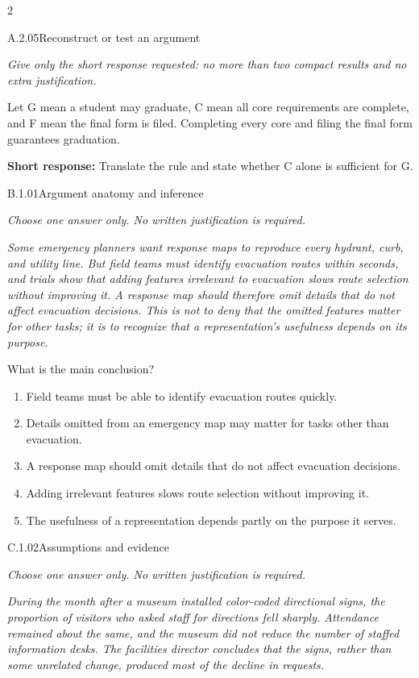 \documentclass[9pt]{extarticle}
\newcommand{\choice}[1]{\item #1}
\begin{document}
\begin{multicols}{2}
\begin{DenseCoreProblem}{A.2.05}{Reconstruct or test an argument}
{\scriptsize\textit{Give only the short response requested: no more than two compact results and no extra justification.}\par}
Let G mean a student may graduate, C mean all core requirements are complete, and F mean the final form is filed. Completing every core and filing the final form guarantees graduation.

\textbf{Short response:} Translate the rule and state whether C alone is sufficient for G.
\end{DenseCoreProblem}
\begin{DenseCoreProblem}{B.1.01}{Argument anatomy and inference}
{\scriptsize\textit{Choose one answer only. No written justification is required.}\par}
\emph{Some emergency planners want response maps to reproduce every hydrant, curb, and utility line. But field teams must identify evacuation routes within seconds, and trials show that adding features irrelevant to evacuation slows route selection without improving it. A response map should therefore omit details that do not affect evacuation decisions. This is not to deny that the omitted features matter for other tasks; it is to recognize that a representation's usefulness depends on its purpose.}

What is the main conclusion?
\begin{enumerate}[label=(\alph*)]
  \choice{Field teams must be able to identify evacuation routes quickly.}
  \choice{Details omitted from an emergency map may matter for tasks other than evacuation.}
  \choice{A response map should omit details that do not affect evacuation decisions.}
  \choice{Adding irrelevant features slows route selection without improving it.}
  \choice{The usefulness of a representation depends partly on the purpose it serves.}
\end{enumerate}
\end{DenseCoreProblem}
\columnbreak
\begin{DenseCoreProblem}{C.1.02}{Assumptions and evidence}
{\scriptsize\textit{Choose one answer only. No written justification is required.}\par}
\emph{During the month after a museum installed color-coded directional signs, the proportion of visitors who asked staff for directions fell sharply. Attendance remained about the same, and the museum did not reduce the number of staffed information desks. The facilities director concludes that the signs, rather than some unrelated change, produced most of the decline in requests.}


\end{DenseCoreProblem}
\end{multicols}
\end{document}
